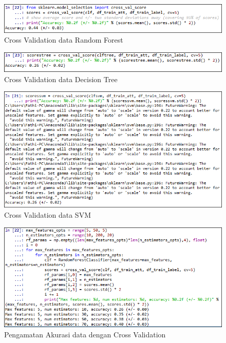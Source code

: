 \begin{figure}
	\centerline{\includegraphics[width=1\textwidth]{figures/fathi/chapter3/hari2/8.png}}
	\caption{Cross Validation data Random Forest}
	\label{p5}
\end{figure}

\begin{figure}
	\centerline{\includegraphics[width=1\textwidth]{figures/fathi/chapter3/hari2/9.png}}
	\caption{Cross Validation data Decision Tree}
	\label{p6}
\end{figure}

\begin{figure}
	\centerline{\includegraphics[width=1\textwidth]{figures/fathi/chapter3/hari2/10.png}}
	\caption{Cross Validation data SVM}
	\label{p7}
\end{figure}

\begin{figure}
	\centerline{\includegraphics[width=1\textwidth]{figures/fathi/chapter3/hari2/11.png}}
	\caption{Pengamatan Akurasi data dengan Cross Validation}
	\label{p8}
\end{figure}

